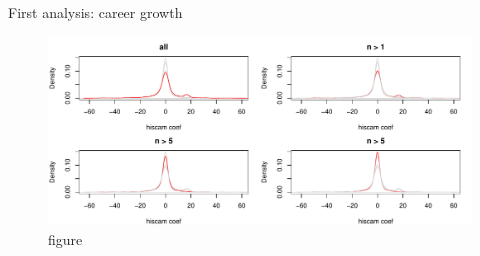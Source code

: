 \documentclass[ignorenonframetext,]{beamer}
\begin{document}
\begin{frame}{First analysis: career growth}

\begin{figure}[htbp]
\centering
\includegraphics{../figures/careergrowth.pdf}
\caption{figure}
\end{figure}

\end{frame}
\end{document}
